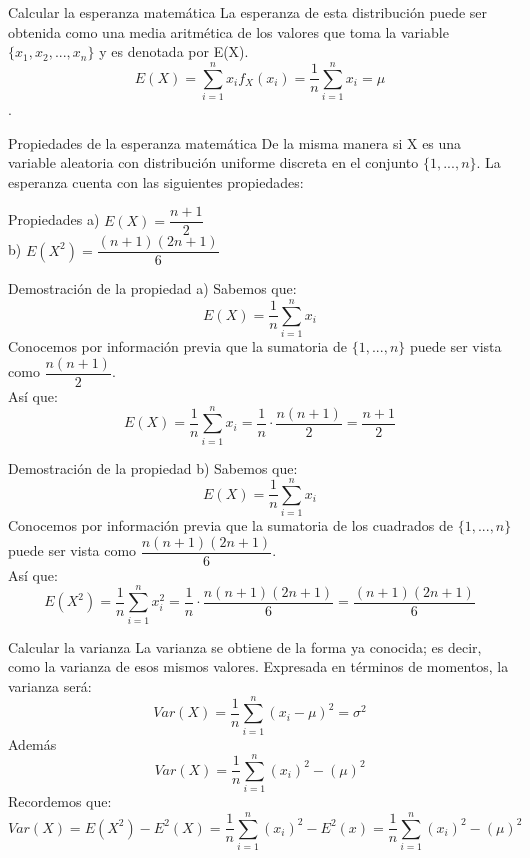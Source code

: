 \documentclass[11pt]{beamer}
\begin{document}
\begin{frame}{Calcular la esperanza matemática}
La esperanza de esta distribución puede ser obtenida como una media aritmética de los valores que toma la variable $\lbrace  x_{1},x_{2},...,x_{n} \rbrace$ y es denotada por E(X).
$$E(X)=\sum_{i=1}^{n}x_{i}f_X(x_{i})=\dfrac{1}{n}\sum_{i=1}^{n}x_{i}=\mu$$. 
\end{frame}

\begin{frame}{Propiedades de la esperanza matemática}
De la misma manera si X es una variable aleatoria  con distribución uniforme discreta en el conjunto $\lbrace 1,...,n \rbrace$. La esperanza cuenta con las siguientes propiedades:
\begin{block}{Propiedades}
a) $E(X) = \dfrac{n + 1}{2}$ \\
b) $E(X^2) = \dfrac{(n + 1)(2n + 1)}{6}$
\end{block}
\end{frame}

\begin{frame}{Demostración de la propiedad a)}
Sabemos que:
$$E(X)=\dfrac{1}{n}\sum_{i=1}^{n}x_{i}$$
Conocemos por información previa que la sumatoria de $\lbrace 1,...,n \rbrace$ puede ser vista como $\dfrac{n(n+1)}{2}$. \\
Así que: 
$$E(X)= \dfrac{1}{n}\sum_{i=1}^{n}x_{i} = \dfrac{1}{n} \cdot \dfrac{n(n+1)}{2} = \dfrac{n + 1}{2}$$
\end{frame}

\begin{frame}{Demostración de la propiedad b)}
Sabemos que:
$$E(X)=\dfrac{1}{n}\sum_{i=1}^{n}x_{i}$$
Conocemos por información previa que la sumatoria de los cuadrados de $\lbrace 1,...,n \rbrace$ puede ser vista como $\dfrac{n(n+1)(2n+1)}{6}$.\\
Así que:
$$E(X^2)= \dfrac{1}{n}\sum_{i=1}^{n}x^2_{i} = \dfrac{1}{n} \cdot \dfrac{n(n+1)(2n+1)}{6}  = \dfrac{(n + 1)(2n + 1)}{6}$$
\end{frame}

\begin{frame}{Calcular la varianza}
La varianza se obtiene de la forma ya conocida; es decir, como la varianza de esos mismos valores. Expresada en términos de momentos, la varianza será:
$$Var(X)=\dfrac{1}{n}\sum_{i=1}^{n}(x_{i}-\mu)^{2}=\sigma ^{2}$$
Además 
$$Var(X) = \dfrac{1}{n}\sum_{i=1}^{n}(x_{i})^2 - (\mu)^{2} $$
Recordemos que:
$$Var(X) = E(X^{2}) - E^{2}(X) = \frac{1}{n}\sum_{i=1}^{n} (x_i)^{2}- E^{2}(x) =  \frac{1}{n}\sum_{i=1}^{n} (x_i)^{2} - (\mu)^{2}$$
\end{frame} 
\end{document}
